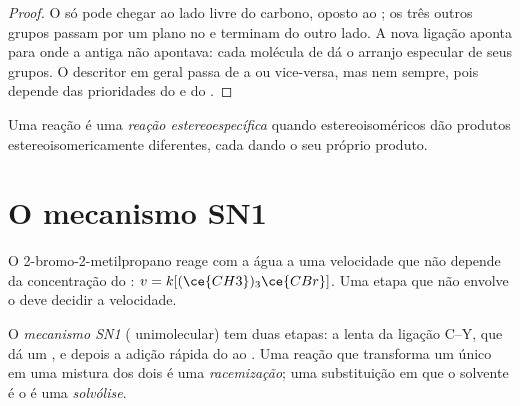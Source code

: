 \begin{proof}
O  só pode chegar ao lado livre do carbono, oposto ao ; os três outros grupos passam por um plano no 
e terminam do outro lado. A nova ligação aponta para onde a antiga não
apontava: cada molécula de  dá o arranjo especular de seus
grupos. O descritor em geral passa de  a  ou vice-versa,
mas nem sempre, pois depende das prioridades do  e do .
\end{proof}

\begin{definition}\label{def:b1:nucleophilic-substitution:stereospecific}
Uma reação é uma \emph{reação estereoespecífica}
quando  estereoisoméricos dão produtos estereoisomericamente
diferentes, cada  dando o seu próprio produto.
\end{definition}

\section{O mecanismo SN1}

O 2-bromo-2-metilpropano reage com a água a uma velocidade que não
depende da concentração do : $v = k[(\ce{CH3})_3\ce{CBr}]$.
Uma etapa que não envolve o  deve decidir a velocidade.

\begin{definition}\label{def:b1:nucleophilic-substitution:sn1}
O \emph{mecanismo SN1} (
unimolecular) tem duas etapas: a  lenta da ligação C--Y, que
dá um , e depois a adição rápida do  ao
. Uma reação que transforma um único  em uma
mistura dos dois é uma \emph{racemização}; uma
substituição em que o solvente é o  é uma
\emph{solvólise}.
\end{definition}

